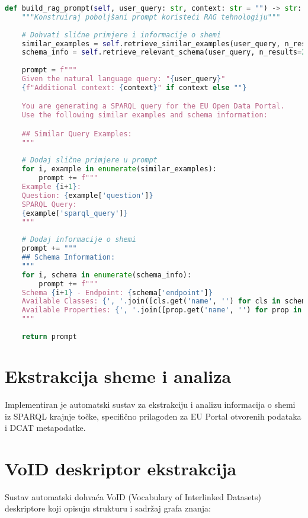 \begin{lstlisting}[language=Python, caption=Konstruiranje RAG prompta, basicstyle=\footnotesize\ttfamily]
def build_rag_prompt(self, user_query: str, context: str = "") -> str:
    """Konstruiraj poboljšani prompt koristeći RAG tehnologiju"""
    
    # Dohvati slične primjere i informacije o shemi
    similar_examples = self.retrieve_similar_examples(user_query, n_results=3)
    schema_info = self.retrieve_relevant_schema(user_query, n_results=2)
    
    prompt = f"""
    Given the natural language query: "{user_query}"
    {f"Additional context: {context}" if context else ""}

    You are generating a SPARQL query for the EU Open Data Portal.
    Use the following similar examples and schema information:

    ## Similar Query Examples:
    """
    
    # Dodaj slične primjere u prompt
    for i, example in enumerate(similar_examples):
        prompt += f"""
    Example {i+1}:
    Question: {example['question']}
    SPARQL Query:
    {example['sparql_query']}
    """
    
    # Dodaj informacije o shemi
    prompt += """
    ## Schema Information:
    """
    for i, schema in enumerate(schema_info):
        prompt += f"""
    Schema {i+1} - Endpoint: {schema['endpoint']}
    Available Classes: {', '.join([cls.get('name', '') for cls in schema['classes'][:10]])}
    Available Properties: {', '.join([prop.get('name', '') for prop in schema['properties'][:15]])}
    """
    
    return prompt
\end{lstlisting}

\section{Ekstrakcija sheme i analiza}
\label{sec:schema_extraction}

Implementiran je automatski sustav za ekstrakciju i analizu informacija o shemi iz SPARQL krajnje točke, specifično prilagođen za EU Portal otvorenih podataka i DCAT metapodatke.

\section{VoID deskriptor ekstrakcija}
\label{sec:void_extraction}

Sustav automatski dohvaća VoID (Vocabulary of Interlinked Datasets) deskriptore koji opisuju strukturu i sadržaj grafa znanja:

